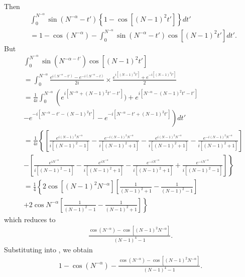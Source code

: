 \documentclass[12pt,reqno]{amsart}
\numberwithin{equation}{section}  %
\renewcommand{\cref}{\Cref}
\begin{document}
%
%
Then 
%
%
\begin{equation}
  \label{pre-int}
\begin{split}
& \int_{0}^{N^{-\alpha}} \sin(N^{-\alpha} - t')
\left\{1 -\cos[(N-1)^{2}t']  \right\} dt' 
\\
& = 1 - \cos(N^{-\alpha}) - \int_{0}^{N^{-\alpha}} \sin(N^{-\alpha} -t')
\cos[(N-1)^{2}t'] dt'.
\end{split}
\end{equation}
%
%
But
%
%
\begin{equation*}
\begin{split}
   & \int_{0}^{N^{-\alpha}} \sin(N^{-\alpha -t'}) \cos[(N-1)^{2}t'] 
   \\
   & = \int_{0}^{N^{-\alpha}} \frac{e^{i(N^{-\alpha} -t')} -
  e^{-i(N^{-\alpha}-t)}}{2i} \times \frac{e^{i[(N-1)^{2}t']} + e^{-i[(N-1)^{2}t']}}{2}
  \\
  & = \frac{1}{4 i} \int_{0}^{N^{-\alpha}} \left( e^{i[N^{-\alpha} + (N-1)^{2}t'
  - t']}) + e^{i[N^{-\alpha} - (N-1)^{2}t' -t']} \right.
  \\
  & \left. - e^{-i[N^{-\alpha} - t' -
  (N-1)^{2}t']} - e^{-i[N^{-\alpha} - t' + (N-1)^{2}t']}  \right) dt'
  \\
  & = \frac{1}{4i} \left \{\left[ \frac{e^{i(N-1)^{2}N^{-\alpha}}}{i[(N-1)^{2}-1]} -
  \frac{e^{-i(N-1)^{2}N^{-\alpha}}}{i[(N-1)^{2} +1]} - \frac{e^{i(N-1)^{2}N^{-
  \alpha}}}{i[(N-1)^{2} +1]} - \frac{e^{-i(N-1)^{2}N^{-\alpha}}}{i[(N-1)^{2} +1]}\right] \right.
  \\
  & - \left. \left[
  \frac{e^{iN^{-\alpha}}}{i[(N-1)^{2} -1]} - \frac{e^{iN^{-\alpha}}}{i[(N-1)^{2} +1]} -
  \frac{e^{-iN^{-\alpha}}}{i[(N-1)^{2} +1]} +
  \frac{e^{-iN^{-\alpha}}}{i[(N-1)^{2} -1]}  \right]  \right \}
  \\
  & = \frac{1}{4} \left\{2 \cos[(N-1)^{2}N^{-\alpha}]\left[
  \frac{1}{(N-1)^{2} +1} - \frac{1}{(N-1)^{2} -1} \right] \right.
  \\
  & + \left. 2 \cos N^{-\alpha}
  \left[ \frac{1}{(N-1)^{2} -1} - \frac{1}{(N-1)^{2} +1} \right] \right\}
\end{split}
\end{equation*}
%
which reduces to
%
%
\begin{equation*}
\begin{split}
 \frac{\cos(N^{-\alpha}) - \cos[(N-1)^{2}N^{-\alpha}]}{(N-1)^{4} -1}.
\end{split}
\end{equation*}
%
%
Substituting into \cref{pre-int}, we obtain
%
%
%
\begin{equation*}
\begin{split}
  1 - \cos (N^{-\alpha}) -
  \frac{\cos(N^{-\alpha}) - \cos[(N-1)^{2}N^{-\alpha}]}{(N-1)^{4} -1}.
\end{split}
\end{equation*}
\end{document}
